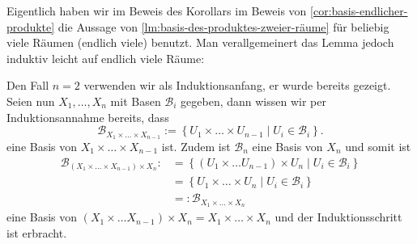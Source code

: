 \begin{remark*}
    Eigentlich haben wir \iflecturenumbers im Beweis des Korollars \else im Beweis von \autoref{cor:basis-endlicher-produkte} \fi die Aussage von \autoref{lm:basis-des-produktes-zweier-räume} für beliebig viele Räumen (endlich viele) benutzt. Man verallgemeinert das Lemma jedoch induktiv leicht auf endlich viele Räume:
\end{remark*}
\begin{proof*}
    Den Fall $n=2$ verwenden wir als Induktionsanfang, er wurde bereits gezeigt. Seien nun $X_1,\ldots,X_n$ mit Basen $\mathcal{B}_i$ gegeben, dann wissen wir per Induktionsannahme bereits, dass 
    \[
    \mathcal{B}_{X_1\times \ldots\times X_{n-1}} := \left \{U_1\times \ldots\times U_{n-1}\mid U_i \in \mathcal{B}_i\right\} 
    .\] 
    eine Basis von $X_1\times \ldots\times X_{n-1}$ ist. Zudem ist $\mathcal{B}_n$ eine Basis von $X_n$ und somit ist
\[
    \begin{split}
        \mathcal{B}_{(X_1\times \ldots\times X_{n-1})\times X_n}:&= \left \{(U_1\times \ldots U_{n-1})\times U_n \mid  U_i \in \mathcal{B}_i\right\} \\
                                                                 &=\left \{U_1\times \ldots\times U_n \mid  U_i \in \mathcal{B}_i\right\} \\
                                                                 &=: \mathcal{B}_{X_1\times \ldots\times X_n}
    \end{split}
\]
eine Basis von $(X_1\times \ldots X_{n-1})\times X_n = X_1\times \ldots\times X_n$ und der Induktionsschritt ist erbracht.
\end{proof*}

